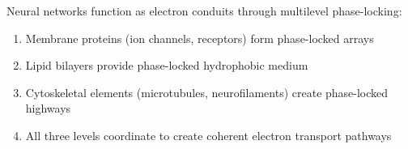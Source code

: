 \begin{theorem}
\label{thm:neural_electron_conduit}
Neural networks function as electron conduits through multilevel phase-locking:
\begin{enumerate}
\item Membrane proteins (ion channels, receptors) form phase-locked arrays
\item Lipid bilayers provide phase-locked hydrophobic medium
\item Cytoskeletal elements (microtubules, neurofilaments) create phase-locked highways
\item All three levels coordinate to create coherent electron transport pathways
\end{enumerate}
\end{theorem}

